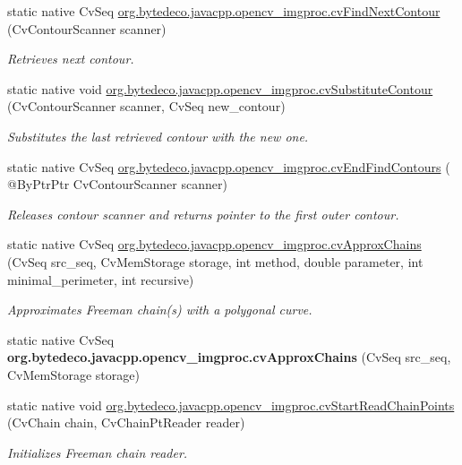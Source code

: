 \begin{DoxyCompactItemize}
\item 
static native Cv\+Seq \hyperlink{group__imgproc__c_gab3ea632f49f741ef73888cd1ab8f9556}{org.\+bytedeco.\+javacpp.\+opencv\+\_\+imgproc.\+cv\+Find\+Next\+Contour} (Cv\+Contour\+Scanner scanner)
\begin{DoxyCompactList}\small\item\em Retrieves next contour. \end{DoxyCompactList}\item 
static native void \hyperlink{group__imgproc__c_ga9d72a578b9f29589e8b85b100cd25e01}{org.\+bytedeco.\+javacpp.\+opencv\+\_\+imgproc.\+cv\+Substitute\+Contour} (Cv\+Contour\+Scanner scanner, Cv\+Seq new\+\_\+contour)
\begin{DoxyCompactList}\small\item\em Substitutes the last retrieved contour with the new one. \end{DoxyCompactList}\item 
static native Cv\+Seq \hyperlink{group__imgproc__c_ga79913a8abbec2491176f92da28a62346}{org.\+bytedeco.\+javacpp.\+opencv\+\_\+imgproc.\+cv\+End\+Find\+Contours} ( @By\+Ptr\+Ptr Cv\+Contour\+Scanner scanner)
\begin{DoxyCompactList}\small\item\em Releases contour scanner and returns pointer to the first outer contour. \end{DoxyCompactList}\item 
static native Cv\+Seq \hyperlink{group__imgproc__c_ga5c874856009b84fc0c3a9533f957516c}{org.\+bytedeco.\+javacpp.\+opencv\+\_\+imgproc.\+cv\+Approx\+Chains} (Cv\+Seq src\+\_\+seq, Cv\+Mem\+Storage storage, int method, double parameter, int minimal\+\_\+perimeter, int recursive)
\begin{DoxyCompactList}\small\item\em Approximates Freeman chain(s) with a polygonal curve. \end{DoxyCompactList}\item 
\mbox{\label{group__imgproc__c_ga5d1f8ced5917a3e4ee4892565c81e7b7}} 
static native Cv\+Seq {\bfseries org.\+bytedeco.\+javacpp.\+opencv\+\_\+imgproc.\+cv\+Approx\+Chains} (Cv\+Seq src\+\_\+seq, Cv\+Mem\+Storage storage)
\item 
static native void \hyperlink{group__imgproc__c_gab6502128f5100580662a79a7326e50e0}{org.\+bytedeco.\+javacpp.\+opencv\+\_\+imgproc.\+cv\+Start\+Read\+Chain\+Points} (Cv\+Chain chain, Cv\+Chain\+Pt\+Reader reader)
\begin{DoxyCompactList}\small\item\em Initializes Freeman chain reader. \end{DoxyCompactList}\item 

\end{DoxyCompactItemize}
